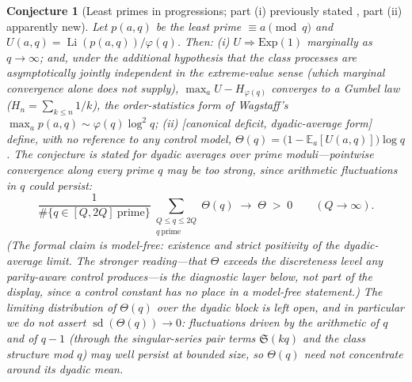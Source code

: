\documentclass[11pt]{article}
\newtheorem{conjecture}{Conjecture}
\theoremstyle{definition}
\newcommand{\Li}{\operatorname{Li}}
\newcommand{\SG}{\mathfrak S}
\begin{document}
\setcounter{conjecture}{2}%
\begin{conjecture}[Least primes in progressions; part (i) previously
stated \cite{HLS,Wagstaff,Fiori,Leung}, part (ii) apparently
new]\label{c22}
Let $p(a,q)$ be the least prime $\equiv a\pmod q$ and
$U(a,q)=\Li(p(a,q))/\varphi(q)$.  Then:
\emph{(i)} $U\Rightarrow\mathrm{Exp}(1)$ marginally as $q\to\infty$;
and, under the additional hypothesis that the class processes are
asymptotically jointly independent in the extreme-value sense (which
marginal convergence alone does not supply),
$\max_a U-H_{\varphi(q)}$ converges to a Gumbel law
($H_n=\sum_{k\le n}1/k$), the order-statistics form of Wagstaff's
$\max_a p(a,q)\sim\varphi(q)\log^2q$;
\emph{(ii)} [canonical deficit, dyadic-average form] define, with no
reference to any control model,
$\Theta(q)=\bigl(1-\mathbb E_a[U(a,q)]\bigr)\log q$.  The conjecture
is stated for dyadic averages over prime moduli---pointwise
convergence along every prime $q$ may be too strong, since
arithmetic fluctuations in $q$ could persist:
\[
\frac1{\#\{q\in[Q,2Q]\ \text{prime}\}}
\sum_{\substack{Q\le q\le2Q\\ q\ \mathrm{prime}}}\Theta(q)
\;\longrightarrow\;\Theta\;>\;0
\qquad(Q\to\infty).
\]
(The formal claim is model-free: existence and strict
positivity of the dyadic-average limit.  The stronger reading---that
$\Theta$ exceeds the discreteness level any parity-aware control
produces---is the diagnostic layer below, not part of the display,
since a control constant has no place in a model-free statement.)
The limiting \emph{distribution} of $\Theta(q)$ over the dyadic
block is left open, and in particular we do \emph{not} assert
$\operatorname{sd}(\Theta(q))\to0$: fluctuations driven by the
arithmetic of $q$ and of $q-1$ (through the singular-series pair
terms $\SG(kq)$ and the class structure mod $q$) may well persist at
bounded size, so $\Theta(q)$ need not concentrate around its
dyadic mean.
\end{conjecture}
\end{document}
